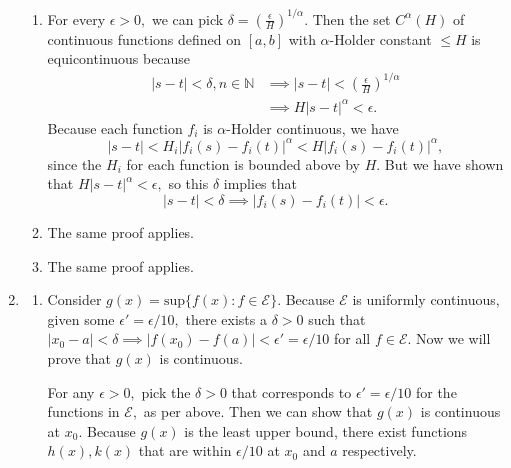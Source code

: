 \documentclass{article}
\numberwithin{equation}{section}
\begin{document}
\begin{enumerate}
\begin{enumerate}
        \item For every $\epsilon > 0,$ we can pick $\delta = \left(\frac{\epsilon}{H}\right)^{1/\alpha}.$ Then the set $C^{\alpha}(H)$ of continuous functions defined on $[a,b]$ with $\alpha$-Holder constant $\le H$ is equicontinuous because 
        \begin{align}
            |s-t| < \delta,n\in \mathbb{N} &\implies |s-t| < \left(\frac{\epsilon}{H}\right)^{1/\alpha} \\ 
            &\implies H|s-t|^\alpha < \epsilon.  
        \end{align}
        Because each function $f_i$ is $\alpha$-Holder continuous, we have
        \begin{equation}
            |s-t| < H_i|f_i(s)-f_i(t)|^\alpha < H|f_i(s)-f_i(t)|^\alpha,
        \end{equation}
        since the $H_i$ for each function is bounded above by $H.$ But we have shown that $H|s-t|^\alpha < \epsilon,$ so this $\delta$ implies that 
        \begin{equation}
            |s-t| < \delta \implies |f_i(s)-f_i(t)| < \epsilon.
        \end{equation} 
        \item The same proof applies.
        \item The same proof applies.
    \end{enumerate}
    \newpage
    \item \begin{enumerate}[label=(\alph*)]
        \item  Consider $g(x) = \text{sup}\{f(x):f\in \mathcal{E}\}.$ Because $\mathcal{E}$ is uniformly continuous, given some $\epsilon'=\epsilon/10,$ there exists a $\delta > 0$ such that $|x_0-a|<\delta \implies |f(x_0)-f(a)|<\epsilon'=\epsilon/10$ for all $f \in \mathcal{E}.$ Now we will prove that $g(x)$ is continuous.
    
        For any $\epsilon > 0,$ pick the $\delta>0$ that corresponds to $\epsilon'=\epsilon/10$ for the functions in $\mathcal{E},$ as per above. Then we can show that $g(x)$ is continuous at $x_0.$ Because $g(x)$ is the least upper bound, there exist functions $h(x),k(x)$ that are within $\epsilon/10$ at $x_0$ and $a$ respectively. 
    

\end{enumerate}
\end{enumerate}
\end{document}
